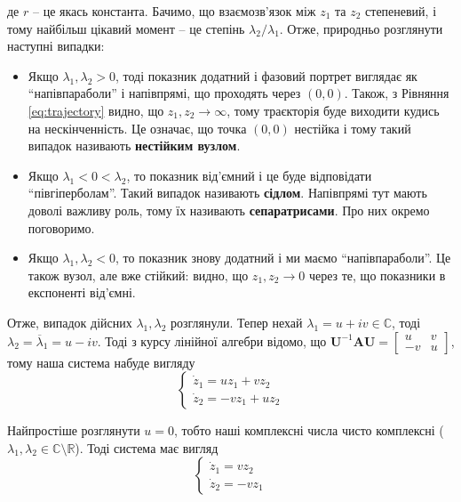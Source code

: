 \documentclass[oneside,solution]{tmpl}
\begin{document}
де $r$ -- це якась константа. Бачимо, що взаємозв'язок між $z_1$ та $z_2$ степеневий, і тому найбільш цікавий момент -- це степінь $\lambda_2/\lambda_1$. Отже, природньо розглянути наступні випадки:
\begin{itemize}
    \item Якщо $\lambda_1, \lambda_2 > 0$, тоді показник додатний і фазовий портрет виглядає як ``напівпараболи'' і напівпрямі, що проходять через $(0,0)$. Також, з Рівняння \ref{eq:trajectory} видно, що $z_1,z_2 \to \infty$, тому траєкторія буде виходити кудись на нескінченність. Це означає, що точка $(0,0)$ нестійка і тому такий випадок називають \textbf{нестійким вузлом}.
    \item Якщо $\lambda_1 < 0 < \lambda_2$, то показник від'ємний і це буде відповідати ``півгіперболам''. Такий випадок називають \textbf{сідлом}. Напівпрямі тут мають доволі важливу роль, тому їх називають \textbf{сепаратрисами}. Про них окремо поговоримо.
    \item Якщо $\lambda_1,\lambda_2 < 0$, то показник знову додатний і ми маємо ``напівпараболи''. Це також вузол, але вже стійкий: видно, що $z_1,z_2 \to 0$ через те, що показники в експоненті від'ємні.
\end{itemize}

Отже, випадок дійсних $\lambda_1,\lambda_2$ розглянули. Тепер нехай $\lambda_1 = u+iv \in \mathbb{C}$, тоді $\lambda_2 = \overline{\lambda}_1 = u-iv$. Тоді з курсу лінійної алгебри відомо, що $\boldsymbol{U}^{-1}\boldsymbol{A}\boldsymbol{U} = \begin{bmatrix}
    u & v \\ -v & u
\end{bmatrix}$, тому наша система набуде вигляду
\begin{equation}
    \begin{cases}
        \dot{z}_1 = uz_1 + vz_2 \\
        \dot{z}_2 = -vz_1 + uz_2
    \end{cases}
\end{equation}

Найпростіше розглянути $u=0$, тобто наші комплексні числа чисто комплексні ($\lambda_1,\lambda_2 \in \mathbb{C} \setminus \mathbb{R}$). Тоді система має вигляд
\begin{equation}
    \begin{cases}
        \dot{z}_1 = vz_2 \\
        \dot{z}_2 = -vz_1
    \end{cases}
\end{equation}
\end{document}
